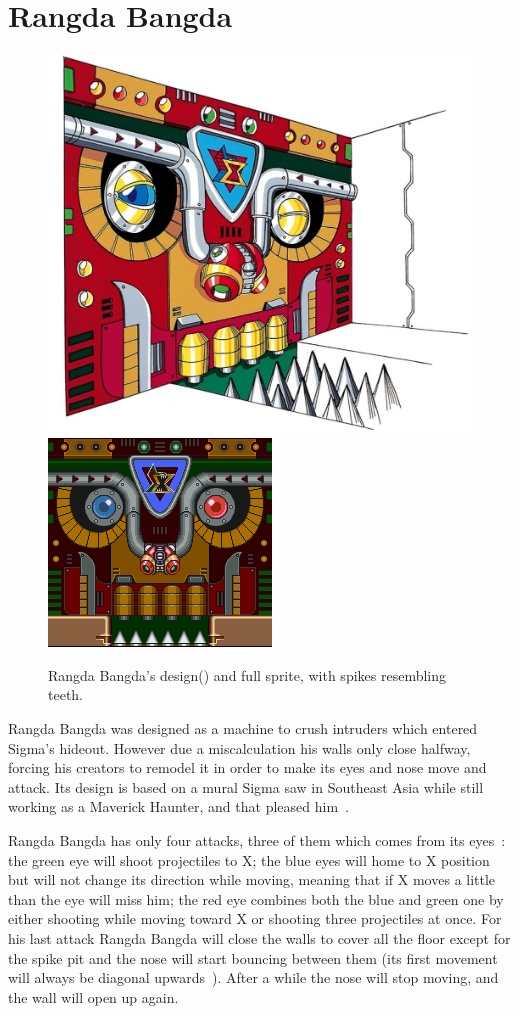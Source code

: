 \section{Rangda Bangda}\label{boss:Rangda_bangda}
\begin{figure}[htp]
	\centering
	\includegraphics[width=0.4\linewidth]{figures/X1/Sigma_stages/RangdaBangda.jpg}
	\includegraphics[width=0.35\linewidth]{figures/X1/Sigma_stages/Rangdabangdasprite.png}
	\caption{Rangda Bangda's design(\cite{book:MMX_Complete_art}) and full sprite, with spikes resembling teeth.}
\end{figure}
Rangda Bangda was designed as a machine to crush intruders which entered Sigma's hideout. However due a miscalculation his walls only close halfway, forcing his creators to remodel it in order to make its eyes and nose move and attack. Its design is based on a mural Sigma saw in Southeast Asia while still working as a Maverick Haunter, and that pleased him~\cite{wayback:X_resources}.

Rangda Bangda has only four attacks, three of them which comes from its eyes~\cite{wiki:Rangda_bangda}: the green eye will shoot projectiles to X; the blue eyes will home to X position but will not change its direction while moving, meaning that if X moves a little than the eye will miss him; the red eye combines both the blue and green one by either shooting while moving toward X or shooting three projectiles at once. For his last attack Rangda Bangda will close the walls to cover all the floor except for the spike pit and the nose will start bouncing between them (its first movement will always be diagonal upwards~\cite{stratwiki:Sigma_stage_2}). After a while the nose will stop moving, and the wall will open up again.

